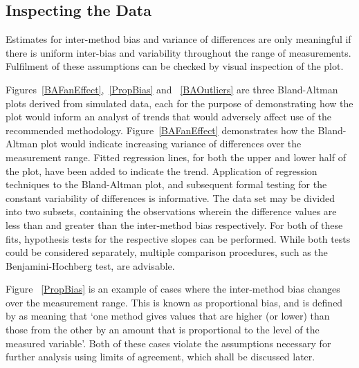 \documentclass[12pt, a4paper]{report}
\theoremstyle{plain}
\theoremstyle{definition}
\theoremstyle{remark}
\begin{document}
	\subsection{Inspecting the Data}

Estimates for inter-method bias and variance of differences are only meaningful if there is uniform inter-bias and variability throughout the range of measurements. Fulfilment of these assumptions can be checked by visual inspection of the plot.

	
	Figures~\ref{BAFanEffect},~\ref{PropBias} and ~\ref{BAOutliers} are three Bland-Altman plots derived from
	simulated data, each for the purpose of demonstrating how the plot would inform an analyst of trends that would adversely affect use of the recommended methodology. Figure~\ref{BAFanEffect} demonstrates how the Bland-Altman plot would indicate
	increasing variance of differences over the measurement range.
	Fitted regression lines, for both the upper and lower half of the	plot, have been added to indicate the trend. Application of regression techniques to the Bland-Altman plot, and subsequent formal testing for the constant variability of differences is informative. The data set may be divided into two subsets, containing the observations wherein the difference values are less than and greater than the inter-method bias respectively. For both of these fits, hypothesis tests for the respective slopes can be performed. While both tests could be considered separately, multiple comparison procedures, such as the Benjamini-Hochberg \citep{BH} test, are advisable.
	
	Figure ~\ref{PropBias} is an example
	of cases where the inter-method bias changes over the measurement range. This is known as proportional bias, and is defined by \citet{ludbrook97} as meaning that `one method gives
	values that are higher (or lower) than those from the other by an
	amount that is proportional to the level of the measured variable'. Both of these cases violate the assumptions necessary for further analysis using limits of agreement, which shall be discussed later. 
	
\end{document}
